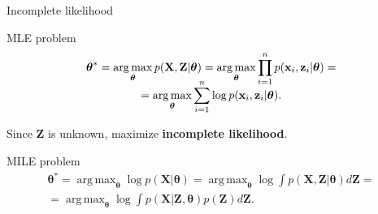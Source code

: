 \documentclass{beamer}
\newcommand{\bx}{\mathbf{x}}
\newcommand{\bz}{\mathbf{z}}
\newcommand{\bX}{\mathbf{X}}
\newcommand{\bZ}{\mathbf{Z}}
\newcommand{\btheta}{\boldsymbol{\theta}}
\DeclareMathOperator*{\argmax}{arg\,max}
\begin{document}
\begin{frame}{Incomplete likelihood}
        \begin{block}{MLE problem}
            \vspace{-0.3cm}
            \begin{multline*}
                \vspace{-0.3cm}
                \btheta^* = \argmax_{\btheta} p(\bX, \bZ | \btheta) = \argmax_{\btheta} \prod_{i=1}^n p(\bx_i, \bz_i | \btheta) = \\ = \argmax_{\btheta} \sum_{i=1}^n \log p(\bx_i, \bz_i | \btheta).
            \end{multline*}
            \vspace{-0.3cm}
        \end{block}
	Since $\bZ$ is unknown, maximize \textbf{incomplete likelihood}.
    \begin{block}{MILE problem}
        \vspace{-0.3cm}
    	\begin{multline*}
        	\btheta^* = \argmax_{\btheta} \log p(\bX| \btheta) = \argmax_{\btheta} \log \int p(\bX, \bZ | \btheta) d \bZ = \\ = \argmax_{\btheta} \log \int p(\bX| \bZ, \btheta) p(\bZ) d\bZ.
    	\end{multline*}
        \vspace{-0.3cm}
	\end{block}
	
\end{frame}
\end{document}

